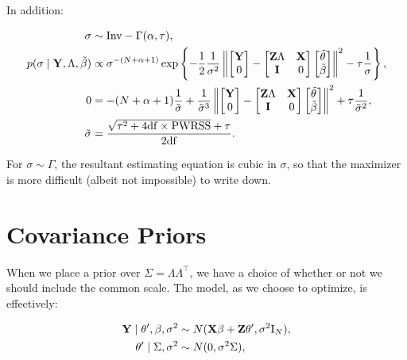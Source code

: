 \documentclass[10pt]{article}
\begin{document}
\noindent In addition:

\begin{align*}
\sigma &\sim \mathrm{Inv}-\Gamma(\alpha, \tau), \\
p(\sigma \mid {\bf Y}, \Lambda, \tilde\beta) & \propto
\sigma^{-(N+ \alpha + 1)} \exp\left\{-\frac{1}{2}\frac{1}{\sigma^2}
\left\|\begin{bmatrix}{\bf Y} \\ 0 \end{bmatrix}
- \begin{bmatrix} {\bf Z}\Lambda & {\bf X} \\ {\bf I} &
  0 \end{bmatrix}
\begin{bmatrix}\tilde\theta \\ \tilde\beta \end{bmatrix}
\right\|^2 - \tau\frac{1}{\sigma}\right\}, \\
0 & = -(N + \alpha + 1)\frac{1}{\tilde\sigma} 
+\frac{1}{\tilde\sigma^3}
\left\|\begin{bmatrix}{\bf Y} \\ 0 \end{bmatrix}
- \begin{bmatrix} {\bf Z}\Lambda & {\bf X} \\ {\bf I} &
  0 \end{bmatrix}
\begin{bmatrix}\tilde\theta \\ \tilde\beta \end{bmatrix}
\right\|^2
+ \tau\frac{1}{\tilde\sigma^2}, \\
\tilde\sigma & = \dfrac{\sqrt{\tau^2 +
    4\mathrm{df}\times\mathrm{PWRSS}}+\tau}{2\mathrm{df}}.
\end{align*}

For $\sigma \sim \Gamma$, the resultant estimating equation is cubic
in $\sigma$, so that the maximizer is more difficult (albeit not
impossible) to write down.

\newpage

\section*{Covariance Priors}

When we place a prior over $\Sigma = \Lambda\Lambda^\top$, we have a
choice of whether or not we should include the common scale. The
model, as we choose to optimize, is effectively:

\begin{align*}
{\bf Y} \mid \theta', \beta, \sigma^2 & \sim
N({\bf X}\beta + {\bf Z}\theta', \sigma^2 \mathrm{I}_N), \\
\theta' \mid \Sigma, \sigma^2 & \sim N(0, \sigma^2\Sigma),
\end{align*}
\end{document}
